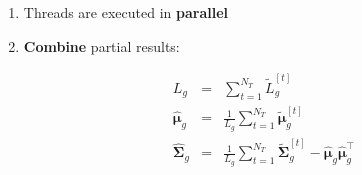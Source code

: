 \documentclass[usenames,dvipsnames]{beamer}
\def\Vec#1{{\boldsymbol{#1}}}
\def\Mat#1{{\boldsymbol{#1}}}
\begin{document}
\begin{frame}
\begin{enumerate}[{~~$\boldsymbol{\bullet}$}]
\item Threads are executed in {\bf parallel}
\vspace{1ex}

\item {\bf Combine} partial results:
%
\begin{scriptsize}%
\vspace{-3.5ex}
\begin{eqnarray*}
  L_g                      & = & \sum\nolimits_{t=1}^{N_T} \widetilde{L}_g^{[t]} \\
  \widehat{\Vec{\mu}}_g    & = & \frac{1}{L_g} \sum\nolimits_{t=1}^{N_T} \widetilde{\Vec{\mu}}_g^{[t]} \\
  \widehat{\Mat{\Sigma}}_g & = & \frac{1}{L_g} \sum\nolimits_{t=1}^{N_T} \widetilde{\Mat{\Sigma}}_g^{[t]} - \widehat{\Vec{\mu}}_g^{~} \widehat{\Vec{\mu}}_g^\top
\end{eqnarray*}%
\end{scriptsize}



\end{enumerate}
\end{frame}
%
%
%
\end{document}
